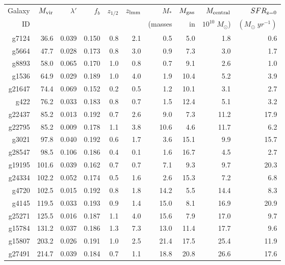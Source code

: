 \begin{tabular}{rrrrrrrrrr}
	\hline
	Galaxy & $M_{\rm vir}$ & $\lambda'$ & $f_b$ & $z_{1/2}$ & $z_{\rm lmm}$ & $M_*$ & $M_{\rm gas}$ & $M_{\rm central}$ & $SFR_{\rm z=0}$ \\
	ID&&&&&&  (masses & in & $10^{10}\;M_\odot$) & $(M_\odot\; yr^{-1})$ \\
	\hline
	\hline
	g7124 & 36.6 & 0.039 & 0.150 & 0.8 & 2.1 & 0.5 & 5.0 & 1.8 & 0.6 \\
	g5664 & 47.7 & 0.028 & 0.173 & 0.8 & 3.0 & 0.9 & 7.3 & 3.0 & 1.7 \\
	g8893 & 58.0 & 0.065 & 0.170 & 1.0 & 0.8 & 0.7 & 9.1 & 2.6 & 1.0 \\
	g1536 & 64.9 & 0.029 & 0.189 & 1.0 & 4.0 & 1.9 & 10.4 & 5.2 & 3.9 \\
	g21647 & 74.4 & 0.069 & 0.152 & 0.2 & 0.5 & 1.2 & 10.1 & 3.1 & 2.7 \\
	g422 & 76.2 & 0.033 & 0.183 & 0.8 & 0.7 & 1.5 & 12.4 & 5.1 & 3.2 \\
	g22437 & 85.2 & 0.013 & 0.192 & 0.7 & 2.6 & 9.0 & 7.3 & 11.2 & 17.9 \\
	g22795 & 85.2 & 0.009 & 0.178 & 1.1 & 3.8 & 10.6 & 4.6 & 11.7 & 6.2 \\
	g3021 & 97.8 & 0.040 & 0.192 & 0.6 & 1.7 & 3.6 & 15.1 & 9.9 & 15.7 \\
	g28547 & 98.5 & 0.106 & 0.186 & 0.4 & 0.1 & 1.6 & 16.7 & 4.5 & 2.7 \\
	g19195 & 101.6 & 0.039 & 0.162 & 0.7 & 0.7 & 7.1 & 9.3 & 9.7 & 20.3 \\
	g24334 & 102.2 & 0.052 & 0.174 & 0.5 & 1.6 & 2.6 & 15.3 & 7.2 & 6.8 \\
	g4720 & 102.5 & 0.015 & 0.192 & 0.8 & 1.8 & 14.2 & 5.5 & 14.4 & 8.3 \\
	g4145 & 119.5 & 0.033 & 0.193 & 0.9 & 1.4 & 15.0 & 8.1 & 16.9 & 20.9 \\
	g25271 & 125.5 & 0.016 & 0.187 & 1.1 & 4.0 & 15.6 & 7.9 & 17.0 & 9.7 \\
	g15784 & 131.2 & 0.037 & 0.186 & 1.3 & 7.3 & 13.0 & 11.4 & 17.7 & 9.6 \\
	g15807 & 203.2 & 0.026 & 0.191 & 1.0 & 2.5 & 21.4 & 17.5 & 25.4 & 11.9 \\
	g27491 & 214.7 & 0.039 & 0.184 & 0.7 & 1.1 & 18.8 & 20.8 & 26.6 & 17.6 \\
	\hline
\end{tabular}
